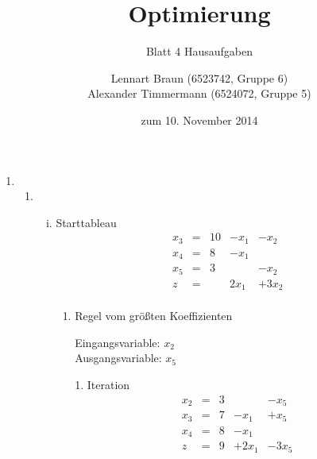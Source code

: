 \documentclass[a4paper]{scrartcl}
\title{Optimierung}
\subtitle{Blatt 4 Hausaufgaben}
\author{
	Lennart Braun (6523742, Gruppe 6) \\
    Alexander Timmermann (6524072, Gruppe 5)
}
\date{zum 10. November 2014}
\begin{document}
\maketitle

\begin{enumerate}
    \item %
        \begin{enumerate}
            \item
                \begin{enumerate}[(i)]
                    \item
                        Starttableau
                        \begin{equation}
                            \begin{array}{rcrrr}
                                x_3 & = & 10 & -x_1 & -x_2 \\
                                x_4 & = & 8 & -x_1 &  \\
                                x_5 & = & 3 &  & -x_2 \\
                                \hline
                                z   & = &   & 2x_1 & +3x_2 \\
                            \end{array}
                        \end{equation}

                        \begin{enumerate}
                            \item Regel vom größten Koeffizienten

                                Eingangsvariable: $x_2$ \\
                                Ausgangsvariable: $x_5$

                                1. Iteration
                                \begin{equation}
                                    \begin{array}{rcrrr}
                                        x_2 & = & 3 &  & -x_5 \\
                                        x_3 & = & 7 & -x_1 & +x_5 \\
                                        x_4 & = & 8 & -x_1 &  \\
                                        \hline
                                        z   & = & 9 & +2x_1 & -3x_5 \\
                                    \end{array}
                                \end{equation}


\end{enumerate}
\end{enumerate}
\end{enumerate}
\end{enumerate}
\end{document}
